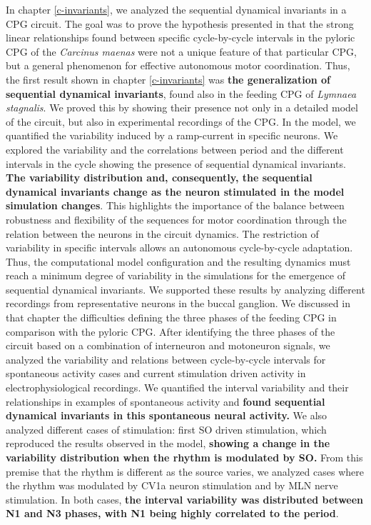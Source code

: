 	
In chapter \ref{c-invariants}, we analyzed the sequential dynamical invariants in a CPG circuit. The goal was to prove the hypothesis presented in \textcite{elices_robust_2019} that the strong linear relationships found between specific cycle-by-cycle intervals in the pyloric CPG of the \textit{Carcinus maenas} were not a unique feature of that particular CPG, but a general phenomenon for effective autonomous motor coordination. Thus, the first result shown in chapter \ref{c-invariants} was \textbf{the generalization of sequential dynamical invariants}, found also in the feeding CPG of \textit{Lymnaea stagnalis}. We proved this by showing their presence not only in a detailed model of the circuit, but also in experimental recordings of the CPG. In the model, we quantified the variability induced by a ramp-current in specific neurons. We explored the variability and the correlations between period and the different intervals in the cycle showing the presence of sequential dynamical invariants.  \textbf{The variability distribution and, consequently, the sequential dynamical invariants change as the neuron stimulated in the model simulation changes}. This highlights the importance of the balance between robustness and flexibility of the sequences for motor coordination through the relation between the neurons in the circuit dynamics. The restriction of variability in specific intervals allows an autonomous cycle-by-cycle adaptation. Thus, the computational model configuration and the resulting dynamics must reach a minimum degree of variability in the simulations for the emergence of sequential dynamical invariants. We supported these results by  analyzing different recordings from representative neurons in the buccal ganglion. We discussed in that chapter the difficulties defining the three phases of the feeding CPG in comparison with the pyloric CPG. After identifying the three phases of the circuit based on a combination of interneuron and motoneuron signals, we analyzed the variability and relations between cycle-by-cycle intervals for spontaneous activity cases and current stimulation driven activity in electrophysiological recordings. We quantified the interval variability and their relationships in examples of spontaneous activity and \textbf{found sequential dynamical invariants in this spontaneous neural activity.} We also analyzed different cases of stimulation: first SO driven stimulation, which reproduced the results observed in the model, \textbf{showing a change in the variability distribution when the rhythm is modulated by SO.} From this premise that the rhythm is different as the source varies, we analyzed cases where the rhythm was modulated by CV1a neuron stimulation and by MLN nerve stimulation. In both cases, \textbf{the interval variability was distributed between N1 and N3 phases, with N1 being highly correlated to the period}.

